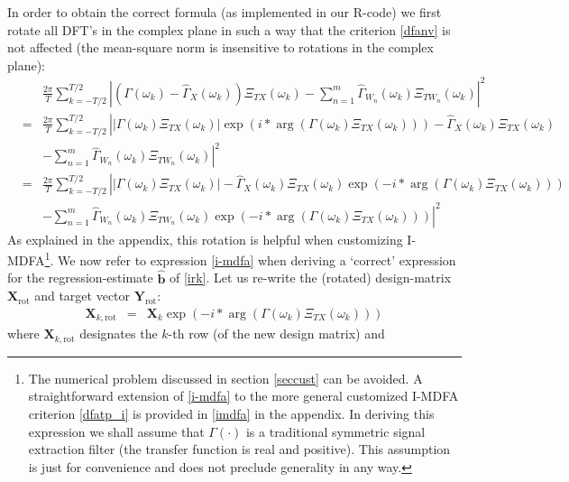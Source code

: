 \documentclass[11pt]{article}
\begin{document}
In order to obtain the correct formula (as implemented in our R-code) we first rotate all DFT's in the complex plane in such a way that the criterion \ref{dfanv} is not affected (the mean-square norm is insensitive to rotations in the complex plane):
\begin{eqnarray}\label{dfanver}
&&\frac{2\pi}{T} \sum_{k=-T/2}^{T/2}
\left|\left(\Gamma(\omega_k)-\hat{\Gamma}_X(\omega_k)\right)\Xi_{T
X}(\omega_k)-\sum_{n=1}^m
\hat{\Gamma}_{W_n}(\omega_k)\Xi_{TW_n}(\omega_k)\right|^2\nonumber \\
&=&\frac{2\pi}{T} \sum_{k=-T/2}^{T/2}
\left|\left|\Gamma(\omega_k)\Xi_{TX}(\omega_k)\right| \exp\left(i*\arg\left(\Gamma(\omega_k)\Xi_{TX}(\omega_k)\right)\right)-\hat{\Gamma}_X(\omega_k)\Xi_{TX}(\omega_k)\right.\nonumber\\
&&\left.-\sum_{n=1}^m
\hat{\Gamma}_{W_n}(\omega_k)\Xi_{TW_n}(\omega_k)\right|^2 \nonumber\\
&=&\frac{2\pi}{T} \sum_{k=-T/2}^{T/2}
\left|\left|\Gamma(\omega_k)\Xi_{TX}(\omega_k)\right| -\hat{\Gamma}_X(\omega_k)\Xi_{TX}(\omega_k)\exp\left(-i*\arg\left(\Gamma(\omega_k)\Xi_{T
X}(\omega_k)\right)\right)\right.\nonumber\\
&&\left.-\sum_{n=1}^m
\hat{\Gamma}_{W_n}(\omega_k)\Xi_{TW_n}(\omega_k)\exp\left(-i*\arg\left(\Gamma(\omega_k)\Xi_{T
X}(\omega_k)\right)\right)\right|^2 \label{i-mdfa}
\end{eqnarray}
As explained in the appendix, this rotation is helpful when customizing I-MDFA\footnote{The numerical problem discussed in section \ref{seccust} can be avoided. A straightforward extension of \ref{i-mdfa} to the more general customized I-MDFA criterion  \ref{dfatp_i} is provided in \ref{imdfa} in the appendix. In deriving this expression 
 we shall assume that $\Gamma(\cdot)$ is a traditional symmetric signal extraction filter (the transfer function is real and positive). This assumption is just for convenience and does not preclude generality in any way.}. 
 We now refer to expression \ref{i-mdfa} when deriving a `correct' expression for the regression-estimate $\mathbf{\hat{b}}$ of \ref{irk}.  
Let us re-write the (rotated) design-matrix $\mathbf{X}_{\textrm{rot}}$ and target vector $\mathbf{Y}_{\textrm{rot}}$:
\begin{eqnarray}\label{desmatrot}
\mathbf{X}_{k,\textrm{rot}}&=&\mathbf{X}_k \exp\left(-i*\arg\left(\Gamma(\omega_k)\Xi_{TX}(\omega_k)\right)\right)
\end{eqnarray}
where $\mathbf{X}_{k,\textrm{rot}}$ designates the $k$-th row (of the new design matrix) and
\end{document}
